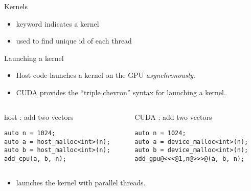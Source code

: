 \documentclass[aspectratio=43]{beamer}
\begin{document}
\begin{frame}[fragile]{Kernels}
    \vspace{-2pt}
    \begin{info}{}
    \begin{itemize}
        \item {} keyword indicates a kernel
        \item {} used to find unique id of each thread
    \end{itemize}
    \end{info}
\end{frame}

\begin{frame}[fragile]{Launching a kernel}
    \begin{itemize}
        \item Host code launches a kernel on the GPU \emph{asynchronously}.
        \item CUDA provides the ``triple chevron''  syntax for launching a kernel.
    \end{itemize}

    \begin{columns}[T]
        \begin{column}{0.5\textwidth}
            \begin{codecolumn}{host : add two vectors}
        \begin{lstlisting}[style=boxcuda]
auto n = 1024;
auto a = host_malloc<int>(n);
auto b = host_malloc<int>(n);
add_cpu(a, b, n);
        \end{lstlisting}
            \end{codecolumn}
        \end{column} \begin{column}{0.5\textwidth}
            \begin{codecolumn}{CUDA : add two vectors}
        \begin{lstlisting}[style=boxcuda]
auto n = 1024;
auto a = device_malloc<int>(n);
auto b = device_malloc<int>(n);
add_gpu@<<<@1,n@>>>@(a, b, n);
        \end{lstlisting}
            \end{codecolumn}
        \end{column}
    \end{columns}

    \begin{itemize}
        \item {} launches the kernel  with  parallel threads.
    \end{itemize}

\end{frame}
\end{document}

